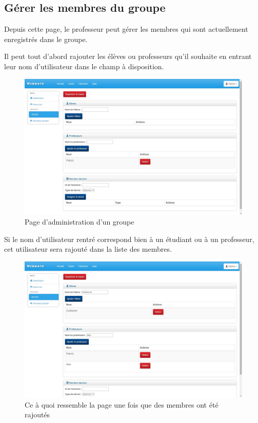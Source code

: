 \documentclass[letterpaper,10pt,french]{sphinxmanual}
\begin{document}
\subsection{Gérer les membres du groupe}
\label{dashboard:gerer-les-membres-du-groupe}
Depuis cette page, le professeur peut gérer les membres qui sont actuellement
enregistrés dans le groupe.

Il peut tout d'abord rajouter les élèves ou professeurs qu'il souhaite en
entrant leur nom d'utilisateur dans le champ à disposition.
\begin{figure}[htbp]
\centering
\capstart

\includegraphics[width=0.600\linewidth]{class.jpg}
\caption{Page d'administration d'un groupe}\end{figure}

Si le nom d'utilisateur rentré correspond bien à un étudiant ou à un professeur,
cet utilisateur sera rajouté dans la liste des membres.
\begin{figure}[htbp]
\centering
\capstart

\includegraphics[width=0.600\linewidth]{classAjouterMembres.jpg}
\caption{Ce à quoi ressemble la page une fois que des membres ont été rajoutés}\end{figure}
\end{document}

